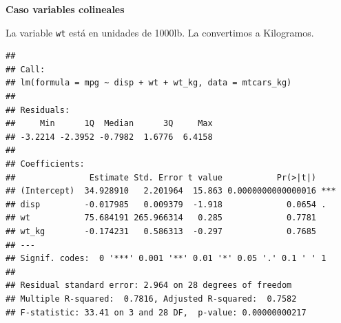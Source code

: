 \documentclass[
  12pt,
]{book}
\newenvironment{Shaded}{\begin{snugshade}}{\end{snugshade}}
\newcommand{\DataTypeTok}[1]{\textcolor[rgb]{0.13,0.29,0.53}{#1}}
\newcommand{\DecValTok}[1]{\textcolor[rgb]{0.00,0.00,0.81}{#1}}
\newcommand{\FloatTok}[1]{\textcolor[rgb]{0.00,0.00,0.81}{#1}}
\newcommand{\KeywordTok}[1]{\textcolor[rgb]{0.13,0.29,0.53}{\textbf{#1}}}
\newcommand{\NormalTok}[1]{#1}
\newcommand{\OperatorTok}[1]{\textcolor[rgb]{0.81,0.36,0.00}{\textbf{#1}}}
\newcommand{\StringTok}[1]{\textcolor[rgb]{0.31,0.60,0.02}{#1}}
\theoremstyle{definition}
\theoremstyle{definition}
\theoremstyle{definition}
\theoremstyle{remark}
\begin{document}
\textbf{Caso variables colineales}

La variable \texttt{wt} está en unidades de 1000lb. La convertimos a Kilogramos.

\begin{Shaded}
\end{Shaded}

\begin{verbatim}
## 
## Call:
## lm(formula = mpg ~ disp + wt + wt_kg, data = mtcars_kg)
## 
## Residuals:
##     Min      1Q  Median      3Q     Max 
## -3.2214 -2.3952 -0.7982  1.6776  6.4158 
## 
## Coefficients:
##               Estimate Std. Error t value           Pr(>|t|)    
## (Intercept)  34.928910   2.201964  15.863 0.0000000000000016 ***
## disp         -0.017985   0.009379  -1.918             0.0654 .  
## wt           75.684191 265.966314   0.285             0.7781    
## wt_kg        -0.174231   0.586313  -0.297             0.7685    
## ---
## Signif. codes:  0 '***' 0.001 '**' 0.01 '*' 0.05 '.' 0.1 ' ' 1
## 
## Residual standard error: 2.964 on 28 degrees of freedom
## Multiple R-squared:  0.7816, Adjusted R-squared:  0.7582 
## F-statistic: 33.41 on 3 and 28 DF,  p-value: 0.00000000217
\end{verbatim}

\begin{Shaded}
\end{Shaded}
\end{document}
